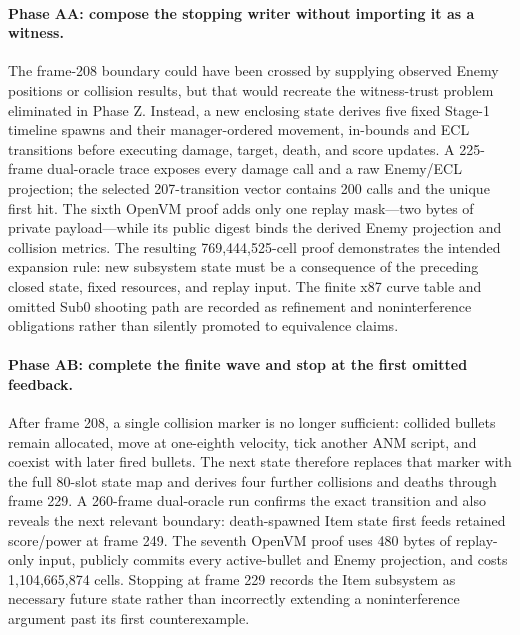 \paragraph{Phase AA: compose the stopping writer without importing it as a
witness.}
The frame-208 boundary could have been crossed by supplying observed Enemy
positions or collision results, but that would recreate the witness-trust
problem eliminated in Phase Z.  Instead, a new enclosing state derives five
fixed Stage-1 timeline spawns and their manager-ordered movement, in-bounds and
ECL transitions before executing damage, target, death, and score updates.  A
225-frame dual-oracle trace exposes every damage call and a raw Enemy/ECL
projection; the selected 207-transition vector contains 200 calls and the
unique first hit.  The sixth OpenVM proof adds only one replay mask---two bytes
of private payload---while its public digest binds the derived Enemy
projection and collision metrics.  The resulting 769,444,525-cell proof
demonstrates the intended expansion rule: new subsystem state must be a
consequence of the preceding closed state, fixed resources, and replay input.
The finite x87 curve table and omitted Sub0 shooting path are recorded as
refinement and noninterference obligations rather than silently promoted to
equivalence claims.

\paragraph{Phase AB: complete the finite wave and stop at the first omitted
feedback.}
After frame 208, a single collision marker is no longer sufficient: collided
bullets remain allocated, move at one-eighth velocity, tick another ANM script,
and coexist with later fired bullets.  The next state therefore replaces that
marker with the full 80-slot state map and derives four further collisions and
deaths through frame 229.  A 260-frame dual-oracle run confirms the exact
transition and also reveals the next relevant boundary: death-spawned Item
state first feeds retained score/power at frame 249.  The seventh OpenVM proof
uses 480 bytes of replay-only input, publicly commits every active-bullet and
Enemy projection, and costs 1,104,665,874 cells.  Stopping at frame 229 records
the Item subsystem as necessary future state rather than incorrectly extending
a noninterference argument past its first counterexample.

